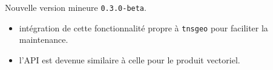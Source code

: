 Nouvelle version mineure \verb+0.3.0-beta+.

\begin{itemize}[itemsep=.5em]
    \item {} intégration de cette fonctionnalité propre à \verb#tnsgeo#  pour faciliter la maintenance.
    
     \item {} l'API est devenue similaire à celle pour le produit vectoriel.
\end{itemize}

\separation
